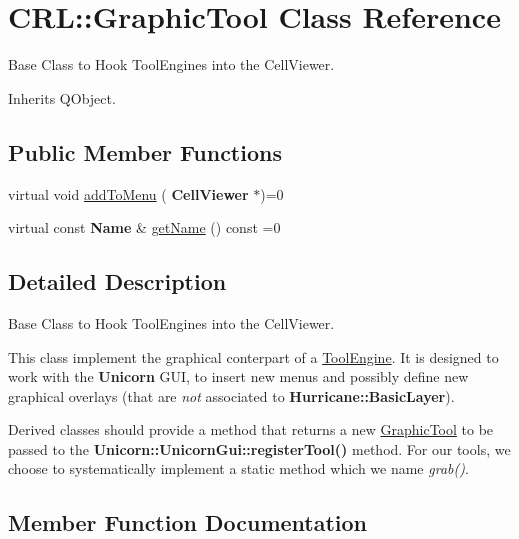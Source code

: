 \hypertarget{classCRL_1_1GraphicTool}{}\section{C\+RL\+:\+:Graphic\+Tool Class Reference}
\label{classCRL_1_1GraphicTool}


Base Class to Hook Tool\+Engines into the Cell\+Viewer.  




Inherits Q\+Object.

\subsection*{Public Member Functions}
\begin{DoxyCompactItemize}
\item 
virtual void \hyperlink{classCRL_1_1GraphicTool_a63941f6c930c08087935ea3e276ee9a9}{add\+To\+Menu} (\textbf{ Cell\+Viewer} $\ast$)=0
\item 
virtual const \textbf{ Name} \& \hyperlink{classCRL_1_1GraphicTool_a4420ce085389f1f9111735031467848d}{get\+Name} () const =0
\end{DoxyCompactItemize}


\subsection{Detailed Description}
Base Class to Hook Tool\+Engines into the Cell\+Viewer. 

This class implement the graphical conterpart of a \hyperlink{classCRL_1_1ToolEngine}{Tool\+Engine}. It is designed to work with the \textbf{ Unicorn} G\+UI, to insert new menus and possibly define new graphical overlays (that are {\itshape not} associated to \textbf{ Hurricane\+::\+Basic\+Layer}).

Derived classes should provide a method that returns a new \hyperlink{classCRL_1_1GraphicTool}{Graphic\+Tool} to be passed to the \textbf{ Unicorn\+::\+Unicorn\+Gui\+::register\+Tool()} method. For our tools, we choose to systematically implement a {\ttfamily static} method which we name {\itshape grab()}. 

\subsection{Member Function Documentation}
\mbox{\label{classCRL_1_1GraphicTool_a63941f6c930c08087935ea3e276ee9a9}} 
